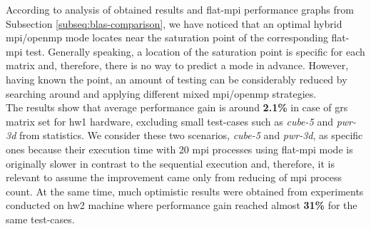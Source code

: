 


According to analysis of obtained results and flat-\acrshort{mpi} performance graphs from Subsection \ref{subseq:blas-comparison}, we have noticed that an optimal hybrid \acrshort{mpi}/\acrshort{openmp} mode locates near the saturation point of the corresponding flat-\acrshort{mpi} test. Generally speaking, a location of the saturation point is specific for each matrix and, therefore, there is no way to predict a mode in advance. However, having known the point, an amount of testing can be considerably reduced by searching around and applying different mixed \acrshort{mpi}/\acrshort{openmp} strategies.\\



The results show that average performance gain is around \textbf{2.1\%} in case of \acrshort{grs} matrix set for \gls{hw1} hardware, excluding small test-cases such as \textit{cube-5} and \textit{pwr-3d} from statistics. We consider these two scenarios, \textit{cube-5} and \textit{pwr-3d}, as specific ones because their execution time with 20 \acrshort{mpi} processes using flat-\acrshort{mpi} mode is originally slower in contrast to the sequential execution and, therefore, it is relevant to assume the improvement came only from reducing of \acrshort{mpi} process count. At the same time, much optimistic results were obtained from experiments conducted on \gls{hw2} machine where performance gain reached almost \textbf{31\%} for the same test-cases.\\



